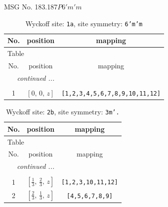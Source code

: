 \documentclass[fleqn,8pt]{jsarticle}
\begin{document}
\setcounter{MaxMatrixCols}{32}

\renewcommand{\tablename}{Table~}
\renewcommand{\figurename}{Figure~}
\begin{center}
\LARGE
MSG No. 183.187\quad$P6'm'm$
\end{center}
\renewcommand{\arraystretch}{1.2}
\begin{longtable}{ccc}
\caption{Wyckoff site: {\tt 1a}, site symmetry: {\tt 6'm'm}}
 \\
 \hline \hline
No. & position & mapping \\ \hline \endfirsthead

\multicolumn{2}{l}{\tablename\ \thetable{}} \\
 \hline \hline
No. & position & mapping \\ \hline \endhead

 \hline \hline
\multicolumn{2}{r}{\footnotesize\it continued ...} \\ \endfoot

 \hline \hline
\multicolumn{2}{r}{} \\ \endlastfoot

1 & $\left[ 0,\, 0,\, z \right]$ & {\tt [1,2,3,4,5,6,7,8,9,10,11,12]} \\
\end{longtable}
\renewcommand{\arraystretch}{1.2}
\begin{longtable}{ccc}
\caption{Wyckoff site: {\tt 2b}, site symmetry: {\tt 3m'.}}
 \\
 \hline \hline
No. & position & mapping \\ \hline \endfirsthead

\multicolumn{2}{l}{\tablename\ \thetable{}} \\
 \hline \hline
No. & position & mapping \\ \hline \endhead

 \hline \hline
\multicolumn{2}{r}{\footnotesize\it continued ...} \\ \endfoot

 \hline \hline
\multicolumn{2}{r}{} \\ \endlastfoot

1 & $\left[ \frac{1}{3},\, \frac{2}{3},\, z \right]$ & {\tt [1,2,3,10,11,12]} \\ \hline
2 & $\left[ \frac{2}{3},\, \frac{1}{3},\, z \right]$ & {\tt [4,5,6,7,8,9]} \\
\end{longtable}
\renewcommand{\arraystretch}{1.2}
\end{document}

